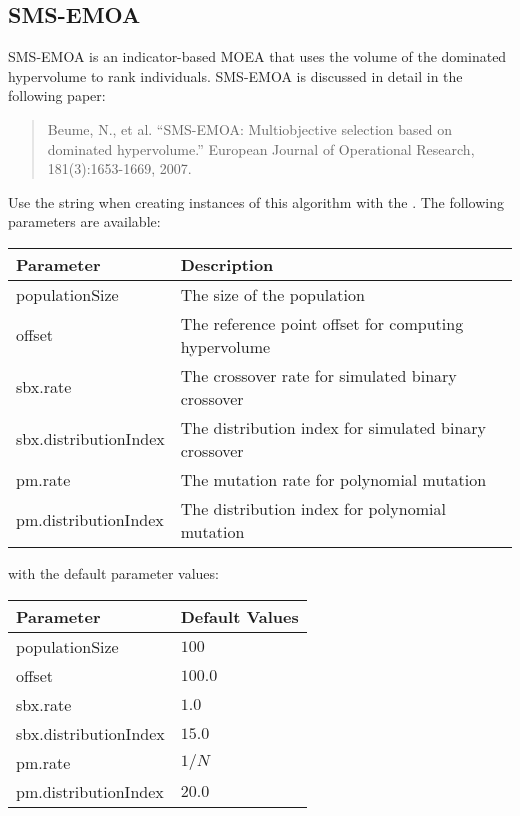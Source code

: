 \subsection{SMS-EMOA}
SMS-EMOA is an indicator-based MOEA that uses the volume of the dominated hypervolume to rank individuals.  SMS-EMOA is discussed in detail in the following paper:
\begin{quote}
Beume, N., et al.  ``SMS-EMOA: Multiobjective selection based on dominated hypervolume.''  European Journal of Operational Research, 181(3):1653-1669, 2007.
\end{quote}
Use the string  when creating instances of this algorithm with the .  The following parameters are available:
\newline
\newline
\begin{tabularx}{\linewidth}{lX}
  \hline
  Parameter & Description \\
  \hline
  populationSize & The size of the population \\
  offset & The reference point offset for computing hypervolume \\
  sbx.rate & The crossover rate for simulated binary crossover \\
  sbx.distributionIndex & The distribution index for simulated binary crossover \\
  pm.rate & The mutation rate for polynomial mutation \\
  pm.distributionIndex & The distribution index for polynomial mutation \\
  \hline
\end{tabularx}
\newline
\newline
with the default parameter values:
\newline
\newline
\begin{tabularx}{\linewidth}{lX}
  \hline
  Parameter & Default Values \\
  \hline
  populationSize & $100$ \\
  offset & $100.0$ \\
  sbx.rate & $1.0$ \\
  sbx.distributionIndex & $15.0$ \\
  pm.rate & $1/N$ \\
  pm.distributionIndex & $20.0$ \\
  \hline
\end{tabularx}

